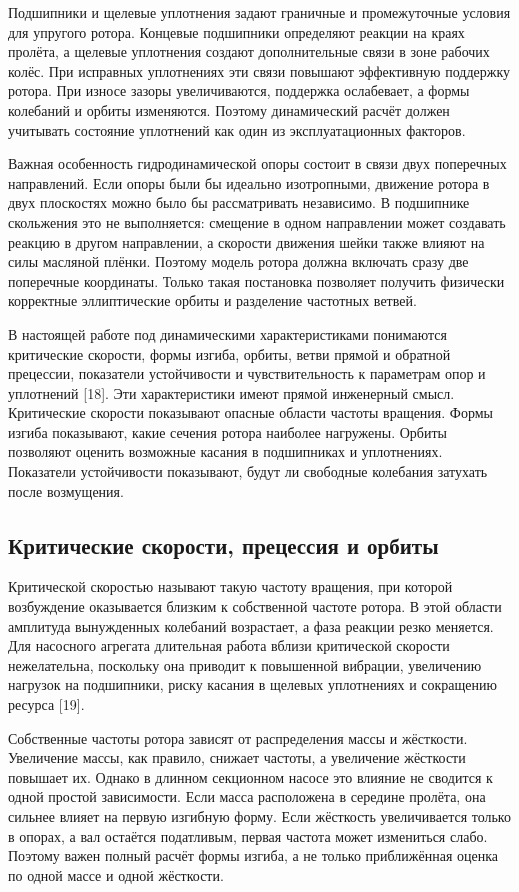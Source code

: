 Подшипники и щелевые уплотнения задают граничные и промежуточные условия для упругого ротора. Концевые подшипники определяют реакции на краях пролёта, а щелевые уплотнения создают дополнительные связи в зоне рабочих колёс. При исправных уплотнениях эти связи повышают эффективную поддержку ротора. При износе зазоры увеличиваются, поддержка ослабевает, а формы колебаний и орбиты изменяются. Поэтому динамический расчёт должен учитывать состояние уплотнений как один из эксплуатационных факторов.

Важная особенность гидродинамической опоры состоит в связи двух поперечных направлений. Если опоры были бы идеально изотропными, движение ротора в двух плоскостях можно было бы рассматривать независимо. В подшипнике скольжения это не выполняется: смещение в одном направлении может создавать реакцию в другом направлении, а скорости движения шейки также влияют на силы масляной плёнки. Поэтому модель ротора должна включать сразу две поперечные координаты. Только такая постановка позволяет получить физически корректные эллиптические орбиты и разделение частотных ветвей.

В настоящей работе под динамическими характеристиками понимаются критические скорости, формы изгиба, орбиты, ветви прямой и обратной прецессии, показатели устойчивости и чувствительность к параметрам опор и уплотнений [18]. Эти характеристики имеют прямой инженерный смысл. Критические скорости показывают опасные области частоты вращения. Формы изгиба показывают, какие сечения ротора наиболее нагружены. Орбиты позволяют оценить возможные касания в подшипниках и уплотнениях. Показатели устойчивости показывают, будут ли свободные колебания затухать после возмущения.

\subsection{Критические скорости, прецессия и орбиты}

Критической скоростью называют такую частоту вращения, при которой возбуждение оказывается близким к собственной частоте ротора. В этой области амплитуда вынужденных колебаний возрастает, а фаза реакции резко меняется. Для насосного агрегата длительная работа вблизи критической скорости нежелательна, поскольку она приводит к повышенной вибрации, увеличению нагрузок на подшипники, риску касания в щелевых уплотнениях и сокращению ресурса [19].

Собственные частоты ротора зависят от распределения массы и жёсткости. Увеличение массы, как правило, снижает частоты, а увеличение жёсткости повышает их. Однако в длинном секционном насосе это влияние не сводится к одной простой зависимости. Если масса расположена в середине пролёта, она сильнее влияет на первую изгибную форму. Если жёсткость увеличивается только в опорах, а вал остаётся податливым, первая частота может измениться слабо. Поэтому важен полный расчёт формы изгиба, а не только приближённая оценка по одной массе и одной жёсткости.

